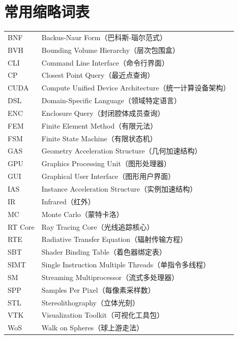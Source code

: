 \chapter{常用缩略词表}
\begin{appendix*}
\begin{tabular}{p{8em}p{28em}}
	BNF     & Backus-Naur Form（巴科斯-瑙尔范式）\\
	BVH     & Bounding Volume Hierarchy（层次包围盒）\\
	CLI     & Command Line Interface（命令行界面）\\
	CP      & Closest Point Query（最近点查询）\\
	CUDA    & Compute Unified Device Architecture（统一计算设备架构）\\
	DSL     & Domain-Specific Language（领域特定语言）\\
	ENC     & Enclosure Query（封闭腔体成员查询）\\
	FEM     & Finite Element Method（有限元法）\\
	FSM     & Finite State Machine（有限状态机）\\
	GAS     & Geometry Acceleration Structure（几何加速结构）\\
	GPU     & Graphics Processing Unit（图形处理器）\\
	GUI     & Graphical User Interface（图形用户界面）\\
	IAS     & Instance Acceleration Structure（实例加速结构）\\
	IR      & Infrared（红外）\\
	MC      & Monte Carlo（蒙特卡洛）\\
	RT Core & Ray Tracing Core（光线追踪核心）\\
	RTE     & Radiative Transfer Equation（辐射传输方程）\\
	SBT     & Shader Binding Table（着色器绑定表）\\
	SIMT    & Single Instruction Multiple Threads（单指令多线程）\\
	SM      & Streaming Multiprocessor（流式多处理器）\\
	SPP     & Samples Per Pixel（每像素采样数）\\
	STL     & Stereolithography（立体光刻）\\
	VTK     & Visualization Toolkit（可视化工具包）\\
	WoS     & Walk on Spheres（球上游走法）\\
\end{tabular}
\end{appendix*}